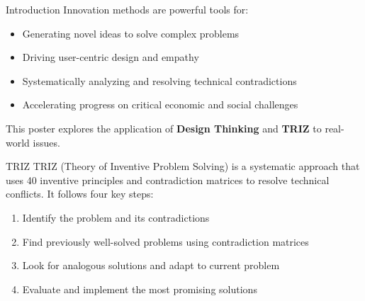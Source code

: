 \documentclass[final]{beamer}
\begin{document}
\begin{frame}{}
\begin{columns}[t]
\begin{column}{.35\linewidth}
\begin{block}{}
				\vspace{2cm}

			\end{block}
			\vspace{1cm}

			\begin{block}{Introduction}
				Innovation methods are powerful tools for:
				\begin{itemize}
					\item Generating novel ideas to solve complex problems
					\item Driving user-centric design and empathy
					\item Systematically analyzing and resolving technical contradictions
					\item Accelerating progress on critical economic and social challenges
				\end{itemize}
				This poster explores the application of \textbf{Design Thinking} and \textbf{TRIZ} to real-world issues.
			\end{block}
			\vspace{1cm}
			\begin{block}{TRIZ}
				TRIZ (Theory of Inventive Problem Solving) is a systematic approach that uses 40 inventive principles and contradiction matrices to resolve technical conflicts. It follows four key steps:
				\begin{enumerate}
					\item Identify the problem and its contradictions
					\item Find previously well-solved problems using contradiction matrices
					\item Look for analogous solutions and adapt to current problem
					\item Evaluate and implement the most promising solutions
				\end{enumerate}
				\vspace{1cm}


\end{block}
\end{column}
\end{columns}
\end{frame}
\end{document}

